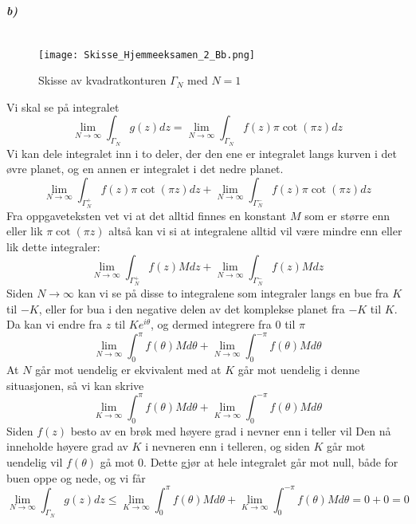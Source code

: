 \documentclass[11pt, A4paper,norsk]{article}
\begin{document}
			\subparagraph{b)}  $ $
				\begin{figure}[H]
\texttt{[image: Skisse\_Hjemmeeksamen\_2\_Bb.png]}
\caption{Skisse av kvadratkonturen $\Gamma_N$ med $N = 1$}
				\end{figure}
				\begin{flushleft}
Vi skal se på integralet
$$\lim_{N \rightarrow \infty} \int_{\Gamma_N} g(z) dz = \lim_{N \rightarrow \infty} \int_{\Gamma_N} f(z) \pi \cot(\pi z) dz$$
Vi kan dele integralet inn i to deler, der den ene er integralet langs kurven i det øvre planet, og en annen er integralet i det nedre planet.
$$\lim_{N \rightarrow \infty} \int_{\Gamma_{N}^{+}} f(z) \pi \cot(\pi z) dz + \lim_{N \rightarrow \infty} \int_{\Gamma_{N}^{-}} f(z) \pi \cot(\pi z) dz$$
Fra oppgaveteksten vet vi at det alltid finnes en konstant $M$ som er større enn eller lik $\pi \cot(\pi z)$ altså kan vi si at integralene alltid vil være mindre enn eller lik dette integraler:
$$\lim_{N \rightarrow \infty} \int_{\Gamma_{N}^{+}} f(z) M dz + \lim_{N \rightarrow \infty} \int_{\Gamma_{N}^{-}} f(z) M dz$$
Siden $N \rightarrow \infty$ kan vi se på disse to integralene som integraler langs en bue fra $K$ til $-K$, eller for bua i den negative delen av det komplekse planet fra $-K$ til $K$. Da kan vi endre fra $z$ til $Ke^{i \theta}$, og dermed integrere fra $0$ til $\pi$
$$\lim_{N \rightarrow \infty} \int_{0}^{\pi} f(\theta) M d\theta + \lim_{N \rightarrow \infty} \int_{0}^{- \pi} f(\theta) M d\theta$$
At $N$ går mot uendelig er ekvivalent med at $K$ går mot uendelig i denne situasjonen, så vi kan skrive
$$\lim_{K \rightarrow \infty} \int_{0}^{\pi} f(\theta) M d\theta + \lim_{K \rightarrow \infty} \int_{0}^{- \pi} f(\theta) M d\theta$$
Siden $f(z)$ besto av en brøk med høyere grad i nevner enn i teller vil Den nå inneholde høyere grad av $K$ i nevneren enn i telleren, og siden $K$ går mot uendelig vil $f(\theta)$ gå mot $0$. Dette gjør at hele integralet går mot null, både for buen oppe og nede, og vi får
$$\lim_{N \rightarrow \infty} \int_{\Gamma_N} g(z) dz \leq \lim_{K \rightarrow \infty} \int_{0}^{\pi} f(\theta) M d\theta + \lim_{K \rightarrow \infty} \int_{0}^{- \pi} f(\theta) M d\theta = 0 + 0 = 0$$
				\end{flushleft}
\end{document}
